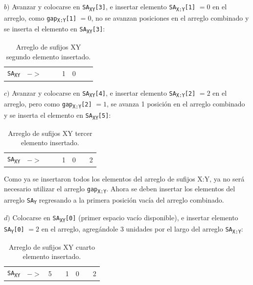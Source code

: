 $b)$ Avanzar y colocarse en \texttt{SA\textsubscript{XY}[3]}, e insertar elemento \texttt{SA\textsubscript{X:Y}[1]} $= 0$ en el arreglo, como \texttt{gap\textsubscript{X:Y}[1]} $= 0$, no se avanzan posiciones en el arreglo combinado y se inserta el elemento en \texttt{SA\textsubscript{XY}[3]}:

\begin{table}[!hbt]
\centering
\begin{tabular}{cc|c|c|c|c|c|c|}
\cline{3-8}
\texttt{SA\textsubscript{XY}} &  $->$ &  &  & 1 & 0 &  &  \\ \cline{3-8} 
\end{tabular}
\caption{Arreglo de sufijos XY segundo elemento insertado.}
\end{table}

$c)$ Avanzar y colocarse en \texttt{SA\textsubscript{XY}[4]}, e insertar elemento \texttt{SA\textsubscript{X:Y}[2]} $= 2$ en el arreglo, pero como \texttt{gap\textsubscript{X:Y}[2]} $= 1$, se avanza 1 posición en el arreglo combinado y se inserta el elemento en \texttt{SA\textsubscript{XY}[5]}:

\begin{table}[!hbt]
\centering
\begin{tabular}{cc|c|c|c|c|c|c|}
\cline{3-8}
\texttt{SA\textsubscript{XY}} &  $->$ &  &  & 1 & 0 &  & 2 \\ \cline{3-8} 
\end{tabular}
\caption{Arreglo de sufijos XY tercer elemento insertado.}
\end{table}

Como ya se insertaron todos los elementos del arreglo de sufijos X:Y, ya no será necesario utilizar el arreglo \texttt{gap\textsubscript{X:Y}}. Ahora se deben insertar los elementos del arreglo \texttt{SA\textsubscript{Y}} regresando a la primera posición vacía del arreglo combinado.

$d)$ Colocarse en \texttt{SA\textsubscript{XY}[0]} (primer espacio vacío disponible), e insertar elemento \texttt{SA\textsubscript{Y}[0]} $= 2$ en el arreglo, agregándole 3 unidades por el largo del arreglo \texttt{SA\textsubscript{X:Y}}:

\begin{table}[!hbt]
\centering
\begin{tabular}{cc|c|c|c|c|c|c|}
\cline{3-8}
\texttt{SA\textsubscript{XY}} &  $->$ & 5 &  & 1 & 0 &  & 2 \\ \cline{3-8} 
\end{tabular}
\caption{Arreglo de sufijos XY cuarto elemento insertado.}
\end{table}

